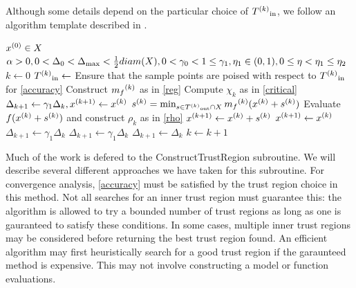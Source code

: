 Although some details depend on the particular choice of ${T^{(k)}}_{\text{in}}$, we follow an algorithm template described in \cite{doi:10.1080/10556788.2015.1026968}.


\begin{algorithmic}

\State $x^{(0)} \in X$
\State $\alpha > 0, 0 < \Delta_0 < \Delta_{\text{max}} < \frac 1 2 diam(X), 0 < \gamma_{0} < 1 \le \gamma_{1}, \eta_1 \in (0,1), 0 \le \eta < \eta_1 \le \eta_2$
\State $k \gets 0$
\Loop
    \State ${T^{(k)}}_{\text{in}}\gets $ 
    \State Ensure that the sample points are poised with respect to ${T^{(k)}}_{\text{in}}$ for \ref{accuracy}
    \State Construct ${{m}_f}^{(k)}$ as in \ref{reg}
    \State Compute $\chi_k$ as in \ref{critical}
        \State $\Delta_{k+1} \gets \gamma_1 \Delta_{k}, x^{(k+1)} \gets {x}^{(k)}$
    \Else
        \State ${s}^{(k)} = \min_{s \in {T^{(k)}}_{\text{out}} \cap X} {{m}_f}^{(k)}({x}^{(k)} + {s}^{(k)})$
        \State Evaluate $f({x}^{(k)} + {s}^{(k)})$ and construct $\rho_k$ as in \ref{rho}
            \State $ {x}^{(k+1)} \gets {x}^{(k)} + {s}^{(k)}$
        \Else
            \State ${x}^{(k+1)} \gets {x}^{(k)} $
        \EndIf
            \State $\Delta_{k+1} \gets \gamma_1\Delta_k$
        \Else
                \State $\Delta_{k+1} \gets \gamma_1\Delta_k$
            \Else
                \State $\Delta_{k+1} \gets \Delta_{k}$
            \EndIf
        \EndIf
    \EndIf
    \State $k \gets k+1$
\EndLoop
\end{algorithmic}

Much of the work is defered to the ConstructTrustRegion subroutine.
We will describe several different approaches we have taken for this subroutine.
For convergence analysis, \ref{accuracy} must be satisfied by the trust region choice in this method.
Not all searches for an inner trust region must guarantee this: the algorithm is allowed to try a bounded number of trust regions as long as one is gauranteed to satisfy these conditions.
In some cases, multiple inner trust regions may be considered before returning the best trust region found.
An efficient algorithm may first heuristically search for a good trust region if the garaunteed method is expensive.
This may not involve constructing a model or function evaluations.


